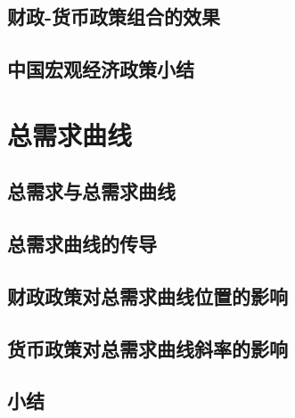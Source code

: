 \documentclass{article}
\begin{document}
\subsection{财政-货币政策组合的效果}

\subsection{中国宏观经济政策小结}


\section{总需求曲线}

\subsection{总需求与总需求曲线}

\subsection{总需求曲线的传导}

\subsection{财政政策对总需求曲线位置的影响}

\subsection{货币政策对总需求曲线斜率的影响}

\subsection{小结}
\end{document}

